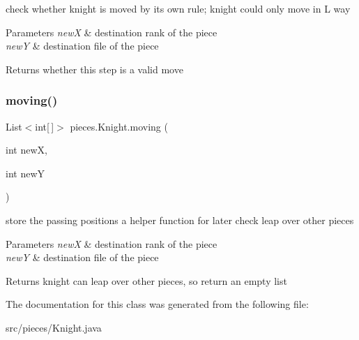 check whether knight is moved by its own rule; knight could only move in \textquotesingle{}L\textquotesingle{} way 
\begin{DoxyParams}{Parameters}
{\em newX} & destination rank of the piece \\
\hline
{\em newY} & destination file of the piece \\
\hline
\end{DoxyParams}
\begin{DoxyReturn}{Returns}
whether this step is a valid move 
\end{DoxyReturn}
\mbox{\label{classpieces_1_1_knight_ab70ead116fdcb7786b07b671639b792e}} 
\subsubsection{\texorpdfstring{moving()}{moving()}}
{\footnotesize\ttfamily List$<$int\mbox{[}$\,$\mbox{]}$>$ pieces.\+Knight.\+moving (\begin{DoxyParamCaption}\item[{int}]{newX,  }\item[{int}]{newY }\end{DoxyParamCaption})\hspace{0.3cm}{\ttfamily [inline]}}

store the passing positions a helper function for later check leap over other pieces 
\begin{DoxyParams}{Parameters}
{\em newX} & destination rank of the piece \\
\hline
{\em newY} & destination file of the piece \\
\hline
\end{DoxyParams}
\begin{DoxyReturn}{Returns}
knight can leap over other pieces, so return an empty list 
\end{DoxyReturn}


The documentation for this class was generated from the following file\+:\begin{DoxyCompactItemize}
\item 
src/pieces/Knight.\+java\end{DoxyCompactItemize}

